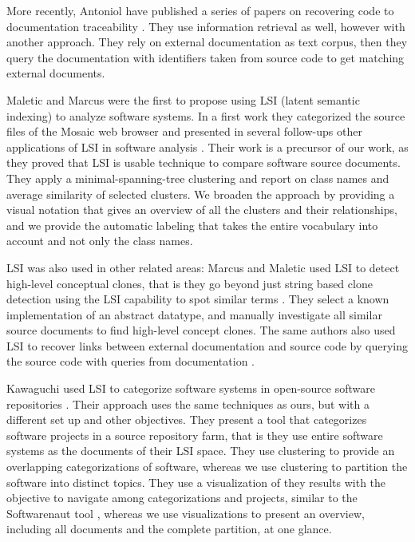 More recently, Antoniol \etal have published a series of papers on recovering code to documentation traceability \cite{Anto00c,Anto02b}. They use information retrieval as well, however with another approach. They rely on external documentation as text corpus, then they query the documentation with identifiers taken from source code to get matching external documents.

Maletic and Marcus were the first to propose using LSI (latent semantic indexing) to analyze software systems. In a first work they categorized the source files of the Mosaic web browser and presented in several follow-ups other applications of LSI in software analysis \cite{Male00a}. Their work is a precursor of our work, as they proved that LSI is usable technique to compare software source documents. They apply a minimal-spanning-tree clustering and report on class names and average similarity of selected clusters. We broaden the approach by providing a visual notation that gives an overview of all the clusters and their relationships, and we provide the automatic labeling that takes the entire vocabulary into account and not only the class names.

LSI was also used in other related areas: Marcus and Maletic used LSI to detect high-level conceptual clones, that is they go beyond just string based clone detection using the LSI capability to spot similar terms \cite{Marc01a}. They
select a known implementation of an abstract datatype, and manually investigate all similar source documents to find high-level concept clones. The same authors also used LSI to recover links between external documentation and source code by querying the source code with queries from documentation \cite{Marc03b}.

Kawaguchi \etal used LSI to categorize software systems in open-source software repositories \cite{Kawa04a}. Their approach uses the same techniques as ours, but with a different set up and other objectives. They present a tool that categorizes software projects in a source repository farm, that is they use entire software systems as the documents of their LSI space. They use clustering to provide an overlapping categorizations of software, whereas we use clustering to partition the software into distinct topics. They use a visualization of they results with the objective to navigate among categorizations and projects, similar to the Softwarenaut tool \cite{Lung06a}, whereas we use visualizations to present an overview, including all documents and the complete partition, at one glance.

